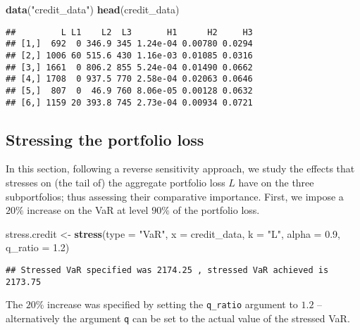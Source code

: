 \documentclass[
]{article}
\newenvironment{Shaded}{\begin{snugshade}}{\end{snugshade}}
\newcommand{\DataTypeTok}[1]{\textcolor[rgb]{0.13,0.29,0.53}{#1}}
\newcommand{\FloatTok}[1]{\textcolor[rgb]{0.00,0.00,0.81}{#1}}
\newcommand{\KeywordTok}[1]{\textcolor[rgb]{0.13,0.29,0.53}{\textbf{#1}}}
\newcommand{\NormalTok}[1]{#1}
\newcommand{\StringTok}[1]{\textcolor[rgb]{0.31,0.60,0.02}{#1}}
\begin{document}
\begin{Shaded}
\begin{Highlighting}[]
\KeywordTok{data}\NormalTok{(}\StringTok{"credit\_data"}\NormalTok{)}
\KeywordTok{head}\NormalTok{(credit\_data)}
\end{Highlighting}
\end{Shaded}

\begin{verbatim}
##         L L1    L2  L3       H1      H2     H3
## [1,]  692  0 346.9 345 1.24e-04 0.00780 0.0294
## [2,] 1006 60 515.6 430 1.16e-03 0.01085 0.0316
## [3,] 1661  0 806.2 855 5.24e-04 0.01490 0.0662
## [4,] 1708  0 937.5 770 2.58e-04 0.02063 0.0646
## [5,]  807  0  46.9 760 8.06e-05 0.00128 0.0632
## [6,] 1159 20 393.8 745 2.73e-04 0.00934 0.0721
\end{verbatim}

\hypertarget{stressing-the-portfolio-loss}{%
\subsection{Stressing the portfolio loss}\label{stressing-the-portfolio-loss}}

In this section, following a reverse sensitivity approach, we study the effects that stresses on (the tail of) the aggregate portfolio loss \(L\) have on the three subportfolios; thus assessing their comparative importance. First, we impose a \(20\%\) increase on the VaR at level \(90\%\) of the portfolio loss.

\begin{Shaded}
\begin{Highlighting}[]
\NormalTok{stress.credit \textless{}{-}}\StringTok{ }\KeywordTok{stress}\NormalTok{(}\DataTypeTok{type =} \StringTok{"VaR"}\NormalTok{, }\DataTypeTok{x =}\NormalTok{ credit\_data, }\DataTypeTok{k =} \StringTok{"L"}\NormalTok{, }\DataTypeTok{alpha =} \FloatTok{0.9}\NormalTok{, }
    \DataTypeTok{q\_ratio =} \FloatTok{1.2}\NormalTok{)}
\end{Highlighting}
\end{Shaded}

\begin{verbatim}
## Stressed VaR specified was 2174.25 , stressed VaR achieved is 2173.75
\end{verbatim}

The \(20\%\) increase was specified by setting the \texttt{q\_ratio} argument to \(1.2\) -- alternatively the argument \texttt{q} can be set to the actual value of the stressed VaR.
\end{document}
